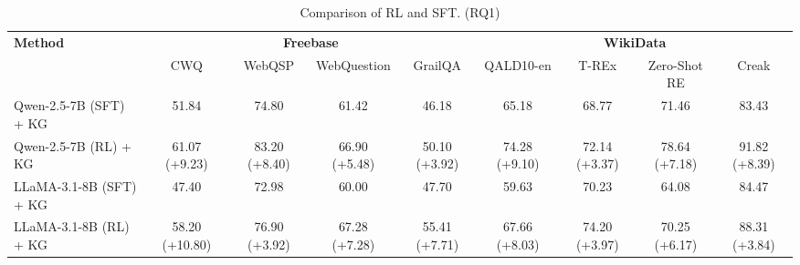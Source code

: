 \documentclass[10pt,conference]{IEEEtran}
\begin{document}
\begin{table}[ht]
\centering
\vspace{-0.3cm}
\caption{
Comparison of RL and SFT. (RQ1)
}
\centering
\renewcommand{\arraystretch}{1.1}
\begin{adjustbox}{width=\textwidth}
\begin{tabular}{lcccccccc}
\toprule
\multirow{2}{*}{\textbf{Method}} & \multicolumn{4}{c}{\textbf{Freebase}} & \multicolumn{4}{c}{\textbf{WikiData}} \\
\cmidrule(lr){2-5} \cmidrule(lr){6-9}
 & CWQ & WebQSP & WebQuestion & GrailQA & QALD10-en & T-REx & Zero-Shot RE & Creak \\
\midrule
Qwen-2.5-7B (SFT) + KG & 51.84 & 74.80 & 61.42 & 46.18 & 65.18 & 68.77 & 71.46 & 83.43 \\
Qwen-2.5-7B (RL) + KG & 61.07 (+9.23) & 83.20 (+8.40) & 66.90 (+5.48) & 50.10 (+3.92) & 74.28 (+9.10) & 72.14 (+3.37) & 78.64 (+7.18) & 91.82 (+8.39) \\
LLaMA-3.1-8B (SFT) + KG & 47.40 & 72.98 & 60.00 & 47.70 & 59.63 & 70.23 & 64.08 & 84.47 \\
LLaMA-3.1-8B (RL) + KG & 58.20 (+10.80) & 76.90 (+3.92) & 67.28 (+7.28) & 55.41 (+7.71) & 67.66 (+8.03) & 74.20 (+3.97) & 70.25 (+6.17) & 88.31 (+3.84) \\
\bottomrule
\end{tabular}%
\end{adjustbox}
\label{tab:sft_vs_rl}
\end{table}
\end{document}
